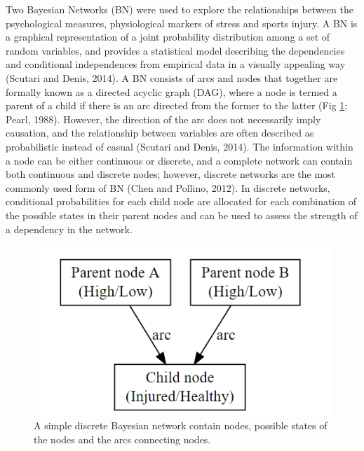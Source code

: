 \documentclass[
  english,
  man,floatsintext]{apa6}
\begin{document}
Two Bayesian Networks (BN) were used to explore the relationships between the psychological measures, physiological markers of stress and sports injury.
A BN is a graphical representation of a joint probability distribution among a set of random variables, and provides a statistical model describing the dependencies and conditional independences from empirical data in a visually appealing way (Scutari and Denis, 2014).
A BN consists of arcs and nodes that together are formally known as a directed acyclic graph (DAG), where a node is termed a parent of a child if there is an arc directed from the former to the latter (Fig \ref{fig:fig5}; Pearl, 1988).
However, the direction of the arc does not necessarily imply causation, and the relationship between variables are often described as probabilistic instead of casual (Scutari and Denis, 2014).
The information within a node can be either continuous or discrete, and a complete network can contain both continuous and discrete nodes; however, discrete networks are the most commonly used form of BN (Chen and Pollino, 2012). In discrete networks, conditional probabilities for each child node are allocated for each combination of the possible states in their parent nodes and can be used to assess the strength of a dependency in the network.

\begin{figure}[H]

{\centering \includegraphics[width=1\linewidth]{figures_doc/examplenetwork} 

}

\caption{A simple discrete Bayesian network contain nodes, possible states of the nodes and the arcs connecting nodes.}\label{fig:fig5}
\end{figure}
\end{document}
